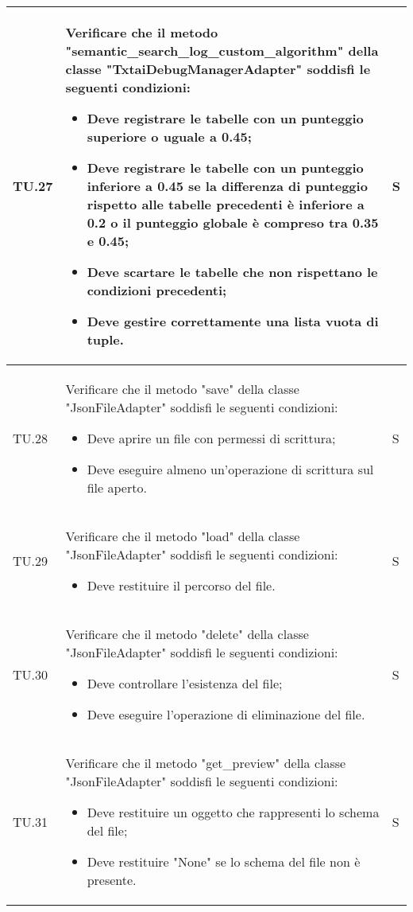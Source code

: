 \begin{adjustwidth}{-0.5cm}{-0.5cm}
\begin{longtable}{|P{1.5cm}|>{\raggedright}P{9.5cm}|>{\arraybackslash}P{1.5cm}|}
		\hline TU.27 & Verificare che il metodo "semantic\_search\_log\_custom\_algorithm" della classe "TxtaiDebugManagerAdapter" soddisfi le seguenti condizioni:
		\begin{itemize}
			\item Deve registrare le tabelle con un punteggio superiore o uguale a 0.45;
			\item Deve registrare le tabelle con un punteggio inferiore a 0.45 se la differenza di punteggio rispetto alle tabelle precedenti è inferiore a 0.2 o il punteggio globale è compreso tra 0.35 e 0.45;
			\item Deve scartare le tabelle che non rispettano le condizioni precedenti;
			\item Deve gestire correttamente una lista vuota di tuple.
		\end{itemize} & S \\

		\hline TU.28 & Verificare che il metodo "save" della classe "JsonFileAdapter" soddisfi le seguenti condizioni:
		\begin{itemize}
			\item Deve aprire un file con permessi di scrittura;
			\item Deve eseguire almeno un'operazione di scrittura sul file aperto.
		\end{itemize} & S \\

		\hline TU.29 & Verificare che il metodo "load" della classe "JsonFileAdapter" soddisfi le seguenti condizioni:
		\begin{itemize}
			\item Deve restituire il percorso del file.
		\end{itemize} & S \\

		\hline TU.30 & Verificare che il metodo "delete" della classe "JsonFileAdapter" soddisfi le seguenti condizioni:
		\begin{itemize}
			\item Deve controllare l'esistenza del file;
			\item Deve eseguire l'operazione di eliminazione del file.
		\end{itemize} & S \\

		\hline TU.31 & Verificare che il metodo "get\_preview" della classe "JsonFileAdapter" soddisfi le seguenti condizioni:
		\begin{itemize}
			\item Deve restituire un oggetto che rappresenti lo schema del file;
			\item Deve restituire "None" se lo schema del file non è presente.
		\end{itemize} & S \\


\end{longtable}
\end{adjustwidth}

